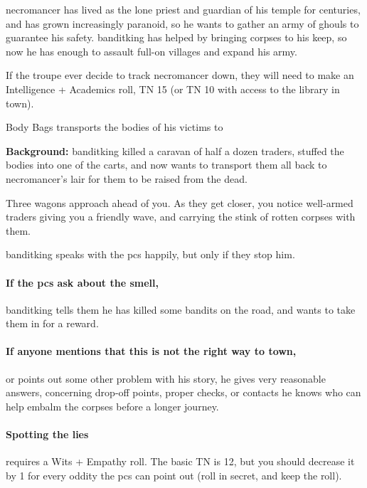 
\noindent
\Gls{necromancer} has lived as the lone priest and guardian of his temple for centuries, and has grown increasingly paranoid, so he wants to gather an army of ghouls to guarantee his safety.
\Gls{banditking} has helped by bringing corpses to his keep, so now he has enough to assault full-on \glspl{village} and expand his army.

If the troupe ever decide to track \gls{necromancer} down, they will need to make an Intelligence + Academics roll, TN 15 (or TN 10 with access to the library in town).

{Body Bags}%
{ transports the bodies of his victims to }%

\textbf{Background:}
\Gls{banditking} killed a caravan of half a dozen traders, stuffed the bodies into one of the carts, and now wants to transport them all back to \gls{necromancer}'s lair for them to be raised from the dead.

\begin{boxtext}
  Three wagons approach ahead of you.
  As they get closer, you notice well-armed traders giving you a friendly wave, and carrying the stink of rotten corpses with them.
\end{boxtext}

\Gls{banditking} speaks with the \glspl{pc} happily, but only if they stop him.

\paragraph{If the \glspl{pc} ask about the smell,}
\gls{banditking} tells them he has killed some bandits on the road, and wants to take them in for a reward.

\paragraph{If anyone mentions that this is not the right way to \gls{town},}
or points out some other problem with his story, he gives very reasonable answers, concerning drop-off points, proper checks, or contacts he knows who can help embalm the corpses before a longer journey.

\paragraph{Spotting the lies}
requires a Wits + Empathy roll.
The basic TN is 12, but you should decrease it by 1 for every oddity the \glspl{pc} can point out (roll in secret, and keep the roll).

